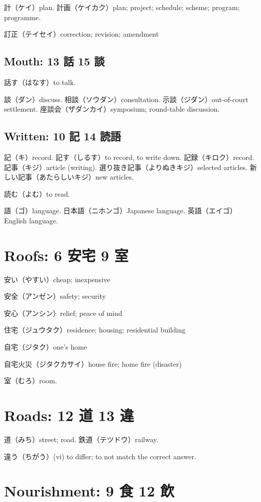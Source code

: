 計（ケイ）plan.
計画（ケイカク）plan; project; schedule; scheme; program; programme.

訂正（テイセイ）correction; revision; amendment

\subsection{Mouth: 13 話 15 談}

話す（はなす）to talk.

談（ダン）discuss.
相談（ソウダン）consultation.
示談（ジダン）out-of-court settlement.
座談会（ザダンカイ）symposium; round-table discussion.

\subsection{Written: 10 記 14 読語}

記（キ）record.
記す（しるす）to record, to write down.
記録（キロク）record.
記事（キジ）article (writing).
選り抜き記事（よりぬきキジ）selected articles.
新しい記事（あたらしいキジ）new articles.

読む（よむ）to read.

語（ゴ）language.
日本語（ニホンゴ）Japanese language.
英語（エイゴ）English language.

\section{Roofs: 6 安宅 9 室}

安い（やすい）cheap; inexpensive

安全（アンゼン）safety; security

安心（アンシン）relief; peace of mind

住宅（ジュウタク）residence; housing; residential building

自宅（ジタク）one's home

自宅火災（ジタクカサイ）house fire; home fire (disaster)

室（むろ）room.

\section{Roads: 12 道 13 違}

道（みち）street; road.
鉄道（テツドウ）railway.

違う（ちがう）(vi) to differ; to not match the correct answer.

\section{Nourishment: 9 食 12 飲}

